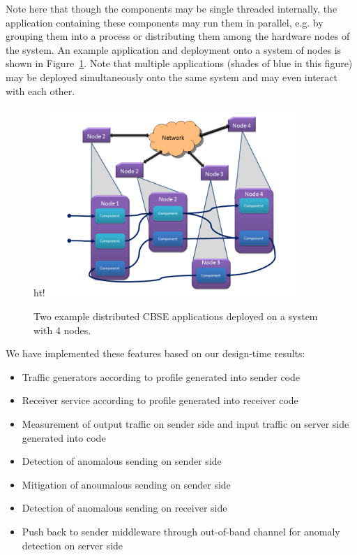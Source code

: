 Note here that though the components may be single threaded
internally, the application containing these components may run them
in parallel, e.g. by grouping them into a process or distributing them
among the hardware nodes of the system.  An example application and
deployment onto a system of nodes is shown in Figure~\ref{fig:cbse}.
Note that multiple applications (shades of blue in this figure) may be
deployed simultaneously onto the same system and may even interact
with each other.

\begin{figure}{ht!}
  \centering
  \includegraphics[width=0.85\textwidth]{../doc/src/images/results/cbse.png}
  \caption{Two example distributed CBSE applications deployed on a system with
    4 nodes.}
  \label{fig:cbse}
\end{figure}
   
We have implemented these features based on our design-time results:

\begin{itemize}
\item Traffic generators according to profile generated into sender code
\item Receiver service according to profile generated into receiver code
\item Measurement of output traffic on sender side and input traffic on
  server side generated into code
\item Detection of anomalous sending on sender side
\item Mitigation of anoumalous sending on sender side
\item Detection of anomalous sending on receiver side
\item Push back to sender middleware through out-of-band channel for
  anomaly detection on server side
\end{itemize}

